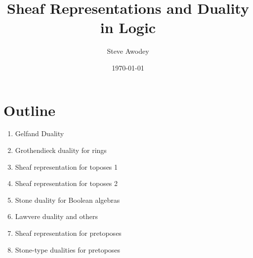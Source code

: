 \documentclass[11pt]{article}
\begin{document}

\title{
Sheaf Representations and Duality in Logic
}
\author{
Steve Awodey
}
\date{
\today}

\maketitle

\section{Outline}


\begin{enumerate}
\item Gelfand Duality

\item Grothendieck duality for rings

\item Sheaf representation for toposes 1%


\item Sheaf representation for toposes 2%

\item Stone duality for Boolean algebras

\item Lawvere duality and others

\item Sheaf representation for pretoposes

\item Stone-type dualities for pretoposes

\end{enumerate}



%






\end{document}
